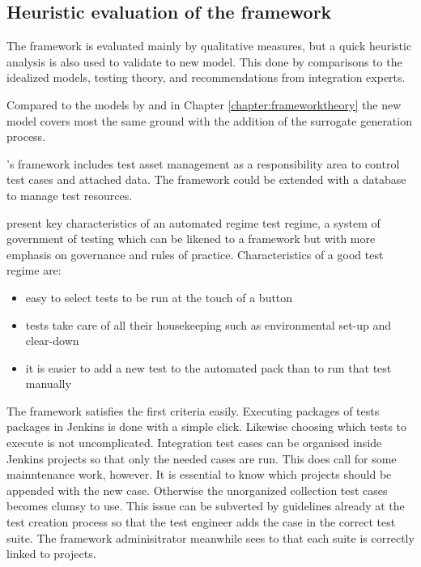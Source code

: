 \documentclass[12pt,a4paper,oneside,pdftex]{report}
\begin{document}
{{%

\subsection{Heuristic evaluation of the framework}

The framework is evaluated mainly by qualitative measures, but a quick heuristic analysis is also used to validate to new model. This done by comparisons to the idealized models, testing theory, and recommendations from integration experts.

Compared to the models by \citet{liu2009unified} and \citet{huang2008surrogate} in Chapter \ref{chapter:frameworktheory} the new model covers most the same ground with the addition of the surrogate generation process. 

\citeauthor{laukkanen2006data}'s \citeyearpar{laukkanen2006data} framework includes test asset management as a responsibility area to control test cases and attached data. The framework could be extended with a database to manage test resources.

\citet{fewster1999software} present key characteristics of an automated regime test regime, a system of government of testing which can be likened to a framework but with more emphasis on governance and rules of practice. Characteristics of a good test regime are:
\begin{itemize}
\item easy to select tests to be run at the touch of a button
\item tests take care of all their housekeeping such as environmental set-up and clear-down
\item it is easier to add a new test to the automated pack than to run that test manually
\end{itemize}

The framework satisfies the first criteria easily. Executing packages of tests packages in Jenkins is done with a simple click. Likewise choosing which tests to execute is not uncomplicated. Integration test cases can be organised inside Jenkins projects so that only the needed cases are run. This does call for some mainntenance work, however. It is essential to know which projects should be appended with the new case. Otherwise the unorganized collection test cases becomes clumsy to use. This issue can be subverted by guidelines already at the test creation process so that the test engineer adds the case in the correct test suite. The framework adminisitrator meanwhile sees to that each suite is correctly linked to projects.

}}
\end{document}
